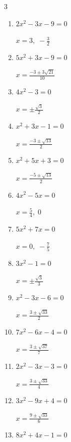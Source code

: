 \begin{multicols}{3}
\begin{enumerate}
        $\displaystyle x=\frac{1\pm \sqrt{13}}{2}$

  \item $2x^{2}-3x-9=0$

        $\displaystyle x=3, \; -\frac{3}{2}$

  \item $5x^{2}+3x-9=0$

        $\displaystyle x=\frac{-3\pm 3\sqrt{21}}{10}$

  \item $4x^{2}-3=0$

        $\displaystyle x=\pm \frac{\sqrt{3}}{2}$

  \item $x^{2}+3x-1=0$

        $\displaystyle x=\frac{-3\pm \sqrt{13}}{2}$

  \item $x^{2}+5x+3=0$

        $\displaystyle x=\frac{-5\pm \sqrt{13}}{2}$

\columnbreak %

  \item $4x^{2}-5x=0$

        $\displaystyle x=\frac{5}{4}, \; 0$

  \item $5x^{2}+7x=0$

        $\displaystyle x=0, \; -\frac{7}{5}$

  \item $3x^{2}-1=0$

        $\displaystyle x=\pm \frac{\sqrt{3}}{3}$

  \item $x^{2}-3x-6=0$

        $\displaystyle x=\frac{3\pm \sqrt{33}}{2}$

  \item $7x^{2}-6x-4=0$

        $\displaystyle x=\frac{3\pm \sqrt{37}}{7}$

  \item $2x^{2}-3x-3=0$

        $\displaystyle x=\frac{3\pm \sqrt{33}}{4}$

  \item $3x^{2}-9x+4=0$

        $\displaystyle x=\frac{9\pm \sqrt{33}}{6}$

\columnbreak %

  \item $8x^{2}+4x-1=0$


\end{enumerate}
\end{multicols}
